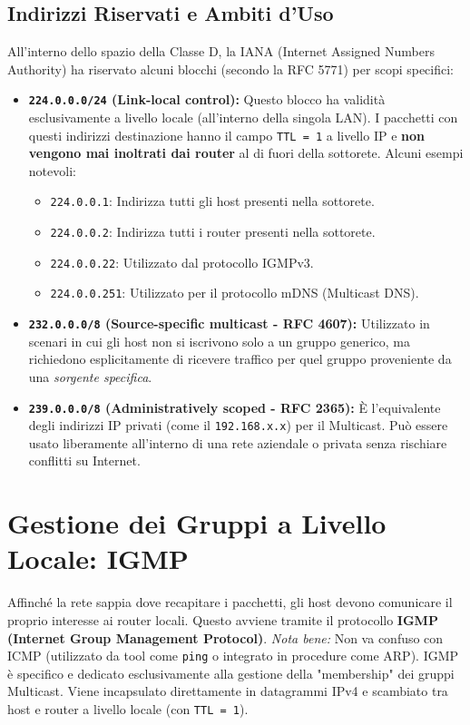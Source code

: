 \subsection{Indirizzi Riservati e Ambiti d'Uso}
All'interno dello spazio della Classe D, la IANA (Internet Assigned Numbers Authority) ha riservato alcuni blocchi (secondo la RFC 5771) per scopi specifici:

\begin{itemize}
    \item \textbf{\texttt{224.0.0.0/24} (Link-local control):} Questo blocco ha validità esclusivamente a livello locale (all'interno della singola LAN). I pacchetti con questi indirizzi destinazione hanno il campo \texttt{TTL = 1} a livello IP e \textbf{non vengono mai inoltrati dai router} al di fuori della sottorete. Alcuni esempi notevoli:
    \begin{itemize}
        \item \texttt{224.0.0.1}: Indirizza tutti gli host presenti nella sottorete.
        \item \texttt{224.0.0.2}: Indirizza tutti i router presenti nella sottorete.
        \item \texttt{224.0.0.22}: Utilizzato dal protocollo IGMPv3.
        \item \texttt{224.0.0.251}: Utilizzato per il protocollo mDNS (Multicast DNS).
    \end{itemize}
    \item \textbf{\texttt{232.0.0.0/8} (Source-specific multicast - RFC 4607):} Utilizzato in scenari in cui gli host non si iscrivono solo a un gruppo generico, ma richiedono esplicitamente di ricevere traffico per quel gruppo proveniente da una \textit{sorgente specifica}.
    \item \textbf{\texttt{239.0.0.0/8} (Administratively scoped - RFC 2365):} È l'equivalente degli indirizzi IP privati (come il \texttt{192.168.x.x}) per il Multicast. Può essere usato liberamente all'interno di una rete aziendale o privata senza rischiare conflitti su Internet.
\end{itemize}

\section{Gestione dei Gruppi a Livello Locale: IGMP}

Affinché la rete sappia dove recapitare i pacchetti, gli host devono comunicare il proprio interesse ai router locali. Questo avviene tramite il protocollo \textbf{IGMP (Internet Group Management Protocol)}.
\textit{Nota bene:} Non va confuso con ICMP (utilizzato da tool come \texttt{ping} o integrato in procedure come ARP). IGMP è specifico e dedicato esclusivamente alla gestione della "membership" dei gruppi Multicast. Viene incapsulato direttamente in datagrammi IPv4 e scambiato tra host e router a livello locale (con \texttt{TTL = 1}).

